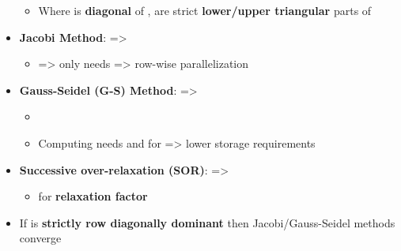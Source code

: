 \begin{itemize}
        \begin{itemize}

          \item
                Where  is \textbf{diagonal} of ,  are
                strict \textbf{lower/upper triangular} parts of 
        \end{itemize}
  \item
        \textbf{Jacobi Method}:  =\textgreater{}

        \begin{itemize}

          \item
                =\textgreater{}  only needs
                =\textgreater{} row-wise parallelization
        \end{itemize}
  \item
        \textbf{Gauss-Seidel (G-S) Method}: 
        =\textgreater{}

        \begin{itemize}

          \item
          \item
                Computing  needs
                 and
                 for  =\textgreater{}
                lower storage requirements
        \end{itemize}
  \item
        \textbf{Successive over-relaxation (SOR)}:
         =\textgreater{}

        \begin{itemize}

          \item
                for \textbf{relaxation factor} \\
        \end{itemize}
  \item
        If  is \textbf{strictly row diagonally dominant} then
        Jacobi/Gauss-Seidel methods converge


\end{itemize}
